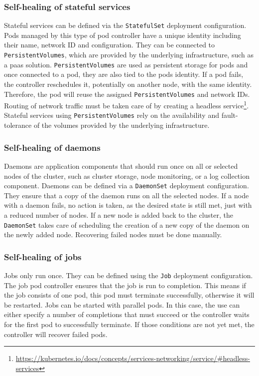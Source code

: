   \subsubsection{Self-healing of stateful services}
    Stateful services can be defined via the \texttt{StatefulSet} deployment configuration.
    Pods managed by this type of \gls{pod controller} have a unique identity including their name, network ID and configuration.
    They can be connected to \texttt{PersistentVolumes}, which are provided by the underlying infrastructure, such as a \gls{paas} solution.
    \texttt{PersistentVolumes} are used as persistent storage for pods and once connected to a pod, they are also tied to the pods identity.
    If a pod fails, the controller reschedules it, potentially on another node, with the same identity.
    Therefore, the pod will reuse the assigned \texttt{PersistentVolumes} and network IDs.
    Routing of network traffic must be taken care of by creating a headless \gls{service}\footnote{\url{https://kubernetes.io/docs/concepts/services-networking/service/\#headless-services}}.
    Stateful services using \texttt{PersistentVolumes} rely on the availability and fault-tolerance of the volumes provided by the underlying infrastructure.

  \subsubsection{Self-healing of daemons}
    Daemons are application components that should run once on all or selected nodes of the cluster, such as cluster storage, node monitoring, or a log collection component.
    Daemons can be defined via a \texttt{DaemonSet} deployment configuration.
    They ensure that a copy of the daemon runs on all the selected nodes.
    If a node with a daemon fails, no action is taken, as the desired state is still met, just with a reduced number of nodes.
    If a new node is added back to the cluster, the \texttt{DaemonSet} takes care of scheduling the creation of a new copy of the daemon on the newly added node.
    Recovering failed nodes must be done manually.

  \subsubsection{Self-healing of jobs}
    Jobs only run once.
    They can be defined using the \texttt{Job} deployment configuration.
    The job \gls{pod controller} ensures that the job is run to completion.
    This means if the job consists of one pod, this pod must terminate successfully, otherwise it will be restarted.
    Jobs can be started with parallel pods.
    In this case, the use can either specify a number of completions that must succeed or the controller waits for the first pod to successfully terminate.
    If those conditions are not yet met, the controller will recover failed pods.

